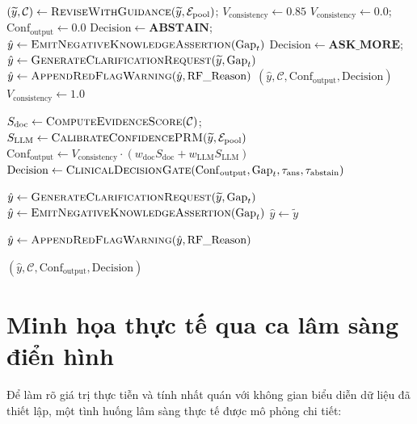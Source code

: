 \begin{algorithm}[h!]
\begin{algorithmic}[1]
    \State $(\widetilde{y}, \mathcal{C}) \leftarrow \Call{ReviseWithGuidance}{\widetilde{y}, \mathcal{E}_{\mathrm{pool}}}$; \quad $V_{\mathrm{consistency}} \leftarrow 0.85$
    \State $V_{\mathrm{consistency}} \leftarrow 0.0$; \quad $\mathrm{Conf}_{\mathrm{output}} \leftarrow 0.0$
        \State $\mathrm{Decision} \leftarrow \mathbf{ABSTAIN}$; \quad $\hat{y} \leftarrow \Call{EmitNegativeKnowledgeAssertion}{\mathrm{Gap}_t}$
    \Else
        \State $\mathrm{Decision} \leftarrow \mathbf{ASK\_MORE}$; \quad $\hat{y} \leftarrow \Call{GenerateClarificationRequest}{\widetilde{y}, \mathrm{Gap}_t}$
    \EndIf
     $\hat{y} \leftarrow \Call{AppendRedFlagWarning}{\hat{y}, \mathrm{RF\_Reason}}$ \EndIf
    \State \Return $(\hat{y}, \mathcal{C}, \mathrm{Conf}_{\mathrm{output}}, \mathrm{Decision})$
\Else
    \State $V_{\mathrm{consistency}} \leftarrow 1.0$
\EndIf

\State $S_{\mathrm{doc}} \leftarrow \Call{ComputeEvidenceScore}{\mathcal{C}}$; \quad $S_{\mathrm{LLM}} \leftarrow \Call{CalibrateConfidencePRM}{\widetilde{y}, \mathcal{E}_{\mathrm{pool}}}$
\State $\mathrm{Conf}_{\mathrm{output}} \leftarrow V_{\mathrm{consistency}} \cdot (w_{\mathrm{doc}} S_{\mathrm{doc}} + w_{\mathrm{LLM}} S_{\mathrm{LLM}})$
\State $\mathrm{Decision} \leftarrow \Call{ClinicalDecisionGate}{\mathrm{Conf}_{\mathrm{output}}, \mathrm{Gap}_t, \tau_{\mathrm{ans}}, \tau_{\mathrm{abstain}}}$

    \State $\hat{y} \leftarrow \Call{GenerateClarificationRequest}{\widetilde{y}, \mathrm{Gap}_t}$
    \State $\hat{y} \leftarrow \Call{EmitNegativeKnowledgeAssertion}{\mathrm{Gap}_t}$
\Else
    \State $\hat{y} \leftarrow \widetilde{y}$
\EndIf

    \State $\hat{y} \leftarrow \Call{AppendRedFlagWarning}{\hat{y}, \mathrm{RF\_Reason}}$
\EndIf

\State \Return $(\hat{y}, \mathcal{C}, \mathrm{Conf}_{\mathrm{output}}, \mathrm{Decision})$
\end{algorithmic}
\end{algorithm}

\section{Minh họa thực tế qua ca lâm sàng điển hình}
Để làm rõ giá trị thực tiễn và tính nhất quán với không gian biểu diễn dữ liệu đã thiết lập, một tình huống lâm sàng thực tế được mô phỏng chi tiết:

